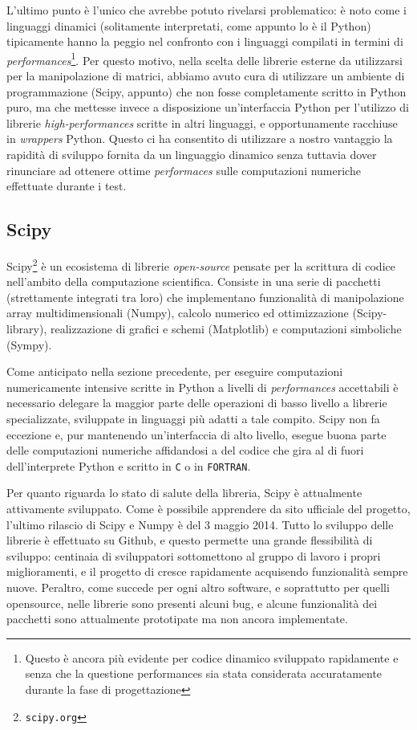 \documentclass[11pt,a4paper]{scrartcl}
\begin{document}
L'ultimo punto è l'unico che avrebbe potuto rivelarsi problematico: è noto come i linguaggi dinamici (solitamente interpretati, come appunto lo è il Python) tipicamente hanno la peggio nel confronto con i linguaggi compilati in termini di \emph{performances}\footnote{Questo è ancora più evidente per codice dinamico sviluppato rapidamente e senza che la questione performances sia stata considerata accuratamente durante la fase di progettazione}. Per questo motivo, nella scelta delle librerie esterne da utilizzarsi per la manipolazione di matrici, abbiamo avuto cura di utilizzare un ambiente di programmazione (Scipy, appunto) che non fosse completamente scritto in Python puro, ma che mettesse invece a disposizione un'interfaccia Python per l'utilizzo di librerie \emph{high-performances} scritte in altri linguaggi, e opportunamente racchiuse in \emph{wrappers} Python. Questo ci ha consentito di utilizzare a nostro vantaggio la rapidità di sviluppo fornita da un linguaggio dinamico senza tuttavia dover rinunciare ad ottenere ottime \emph{performaces} sulle computazioni numeriche effettuate durante i test.


\subsection*{Scipy}
Scipy\footnote{\texttt{scipy.org}} è un ecosistema di librerie \emph{open-source} pensate per la scrittura di codice nell'ambito della computazione scientifica. Consiste in una serie di pacchetti (strettamente integrati tra loro) che implementano funzionalità di manipolazione array multidimensionali (Numpy), calcolo numerico ed ottimizzazione (Scipy-library), realizzazione di grafici e schemi (Matplotlib) e computazioni simboliche (Sympy).

Come anticipato nella sezione precedente, per eseguire computazioni numericamente intensive scritte in Python a livelli di \emph{performances} accettabili è necessario delegare la maggior parte delle operazioni di basso livello a librerie specializzate, sviluppate in linguaggi più adatti a tale compito. Scipy non fa eccezione e, pur mantenendo un'interfaccia di alto livello, esegue buona parte delle computazioni numeriche affidandosi a del codice che gira al di fuori dell'interprete Python e scritto in \texttt{C} o in \texttt{FORTRAN}. 

Per quanto riguarda lo stato di salute della libreria, Scipy è attualmente attivamente sviluppato. Come è possibile apprendere da sito ufficiale del progetto, l'ultimo rilascio di Scipy e Numpy è del 3 maggio 2014. Tutto lo sviluppo delle librerie è effettuato su Github, e questo permette una grande flessibilità di sviluppo: centinaia di sviluppatori sottomettono al gruppo di lavoro i propri miglioramenti, e il progetto di cresce rapidamente acquisendo funzionalità sempre nuove. Peraltro, come succede per ogni altro software, e soprattutto per quelli opensource, nelle librerie sono presenti alcuni bug, e alcune funzionalità dei pacchetti sono attualmente prototipate ma non ancora implementate.
\end{document}
